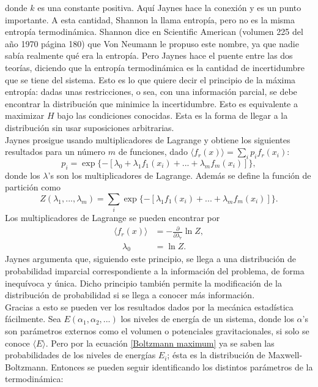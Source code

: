 donde $k$ es una constante positiva. Aquí Jaynes hace la conexión y es un punto importante. A esta cantidad, Shannon la llama entropía, pero no es la misma entropía termodinámica. Shannon dice en Scientific American (volumen 225 del año 1970  página 180) que Von Neumann le propuso este nombre, ya que nadie sabía realmente qué era la entropía. Pero Jaynes hace el puente entre las dos teorías, diciendo que la entropía termodinámica es la cantidad de incertidumbre que se tiene del sistema. Esto es lo que quiere decir el principio de la máxima entropía: dadas unas restricciones, o sea, con una información parcial, se debe encontrar la distribución que minimice la incertidumbre. Esto es equivalente a maximizar $H$ bajo las condiciones conocidas. Esta es la forma de llegar a la distribución sin usar suposiciones arbitrarias.
\\
Jaynes prosigue usando multiplicadores de Lagrange y obtiene los siguientes resultados para un número $m$ de funciones, dado  $\langle f_{r}(x) \rangle = \sum_{i} p_{i} f_{r} (x_{i})$:
\begin{equation} \label{Boltzmann maximum}
p_{i}= \exp \{ -[\lambda_{0}+ \lambda_{1}f_{1}(x_{i})+...+\lambda_{m} f_{m}(x_{i})] \},
\end{equation}
donde los $\lambda$'s son los multiplicadores de Lagrange. Además se define la función de partición como
\begin{equation}
Z(\lambda_{1},...,\lambda_{m})=\sum_{i} \exp \{ -[ \lambda_{1}f_{1}(x_{i})+...+\lambda_{m} f_{m}(x_{i})] \}.
\end{equation}
Los multiplicadores de Lagrange se pueden encontrar por
\begin{align*}
\langle f_{r}(x) \rangle  &= - \frac{\partial}{\partial \lambda_{r}} \ln Z, \\
\quad \lambda_{0} &= \ln Z.
\end{align*}
Jaynes argumenta que, siguiendo este principio, se llega a una distribución de probabilidad imparcial correspondiente a la información del problema, de forma inequívoca y única. Dicho principio también permite la modificación de la distribución de probabilidad si se llega a conocer más información.
\\
Gracias a esto se pueden ver los resultados dados por la mecánica estadística fácilmente. Sea $E(\alpha_{1},\alpha_{2},...)$ los niveles de energía de un sistema, donde los $\alpha$'s son parámetros externos como el volumen o potenciales gravitacionales, si solo se conoce $\langle E \rangle $. Pero por la ecuación \ref{Boltzmann maximum} ya se saben las probabilidades de los niveles de energías $E_{i}$; ésta es la distribución de Maxwell-Boltzmann. Entonces se pueden seguir identificando los distintos parámetros de la termodinámica:
